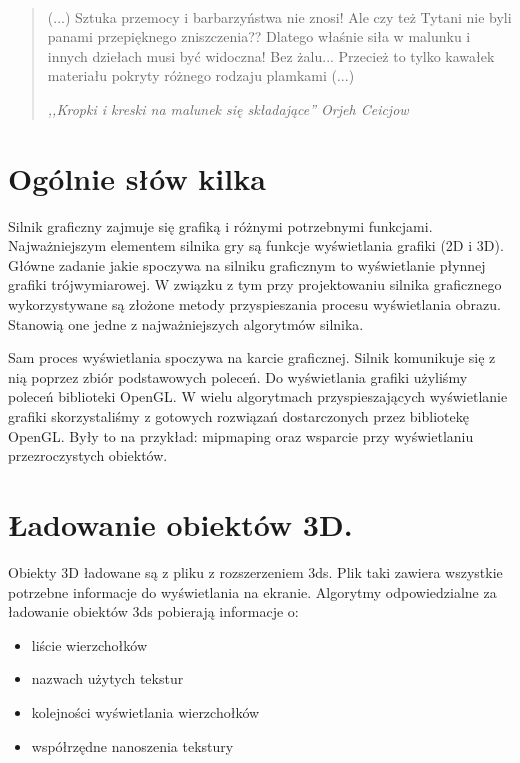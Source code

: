 \documentclass[licencjacka]{pracamgr}
\begin{document}
\ \

\begin{quote}

(...)
Sztuka przemocy i barbarzyństwa nie znosi! Ale czy też Tytani nie byli panami przepięknego zniszczenia??
Dlatego właśnie siła w malunku i innych dziełach musi być widoczna! Bez żalu... Przecież to tylko kawałek materiału
pokryty różnego rodzaju plamkami (...)
  \ \

\raggedleft\slshape ,,Kropki i kreski na malunek się składające'' Orjeh Ceicjow
\end{quote}


\section{Ogólnie słów kilka}

Silnik graficzny zajmuje się grafiką i różnymi potrzebnymi funkcjami. Najważniejszym elementem silnika gry są funkcje wyświetlania grafiki (2D i 3D). Główne zadanie jakie spoczywa na silniku graficznym to wyświetlanie płynnej grafiki trójwymiarowej. W związku z tym przy projektowaniu silnika graficznego wykorzystywane są złożone metody przyspieszania procesu wyświetlania obrazu. Stanowią one jedne z najważniejszych algorytmów silnika.

Sam proces wyświetlania spoczywa na karcie graficznej. Silnik komunikuje się z nią poprzez zbiór podstawowych poleceń. Do wyświetlania grafiki użyliśmy poleceń biblioteki OpenGL.
W wielu algorytmach przyspieszających wyświetlanie grafiki skorzystaliśmy z gotowych rozwiązań dostarczonych przez bibliotekę OpenGL. Były to na przykład: mipmaping oraz wsparcie przy wyświetlaniu przezroczystych obiektów.

\section{Ładowanie obiektów 3D.}

Obiekty 3D ładowane są z pliku z rozszerzeniem 3ds. Plik taki zawiera wszystkie potrzebne informacje do wyświetlania na ekranie. Algorytmy odpowiedzialne za ładowanie obiektów 3ds pobierają informacje o:
\begin{itemize}
    \item liście wierzchołków
    \item   nazwach użytych tekstur
  \item kolejności wyświetlania wierzchołków
  \item współrzędne nanoszenia tekstury

\end{itemize}
\end{document}
